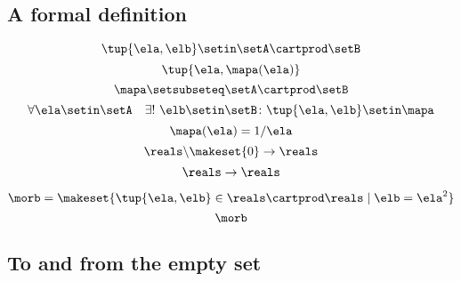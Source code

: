 \begin{forslides}
\subsection{A formal definition}

\begin{equation}\label{eq:slides_session2_107}
\tup{\ela, \elb} \setin\setA \cartprod \setB
\end{equation}
\begin{equation}\label{eq:slides_session2_108}
\tup{\ela, \mapa(\ela)}
\end{equation}
\begin{equation}\label{eq:slides_session2_109}
\mapa \setsubseteq \setA \cartprod \setB
\end{equation}
\begin{equation}\label{eq:slides_session2_110}
\forall \ela \setin\setA  \quad  \exists !
        \ \elb \setin\setB \colon \tup{\ela,\elb} \setin\mapa
\end{equation}
\begin{equation}\label{eq:slides_session2_111}
\mapa(\ela) = 1/ \ela
\end{equation}
\begin{equation}\label{eq:slides_session2_112}
\reals \backslash \makeset{ 0 } \to \reals
\end{equation}
\begin{equation}\label{eq:slides_session2_113}
\reals \to \reals
\end{equation}

\begin{equation}\label{eq:slides_session2_113a}
\morb = \makeset{\tup{\ela, \elb} \in \reals \cartprod \reals \mid \elb = \ela^2}
\end{equation}
\begin{equation}\label{eq:slides_session2_113b}
\morb
\end{equation}



\subsection{To and from the empty set}


\end{forslides}
